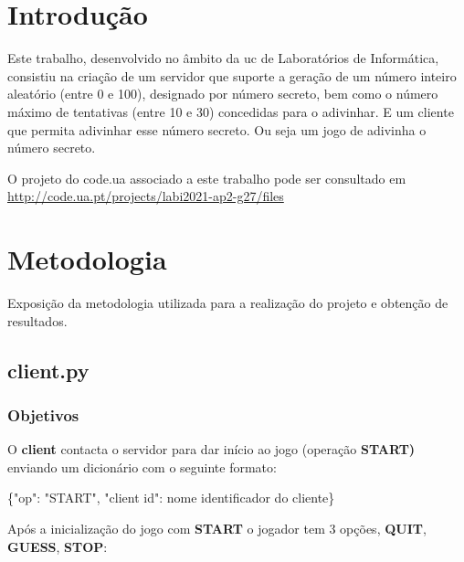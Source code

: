 \documentclass{report}
\begin{document}
\tableofcontents
\listoffigures


\clearpage
{}


\chapter{Introdução}
\label{chap.introducao}

Este trabalho, desenvolvido no âmbito da \ac{uc} de Laboratórios de Informática, consistiu na criação de um servidor que suporte a geração de um número inteiro
aleatório (entre 0 e 100), designado por número secreto, bem como o número
máximo de tentativas (entre 10 e 30) concedidas para o adivinhar. E um cliente que
permita adivinhar esse número secreto. Ou seja um jogo de adivinha o número secreto.\newline
\hfill


O projeto do code.ua associado a este trabalho pode ser consultado em \url{http://code.ua.pt/projects/labi2021-ap2-g27/files}


\chapter{Metodologia}
\label{chap.metodologia}
Exposição da metodologia utilizada para a realização do projeto e obtenção de resultados.


\section{client.py}

\subsection{Objetivos}
O \textbf{client} contacta o servidor para dar início ao jogo (operação \textbf{START)} enviando
um dicionário com o seguinte formato:
\newline

\{"op": "START", "client \textunderscore id": nome identificador do cliente\}
\newline

Após a inicialização do jogo com \textbf{START} o jogador tem 3 opções, \textbf{QUIT}, \textbf{GUESS}, \textbf{STOP}:
\newline
	
\end{document}
